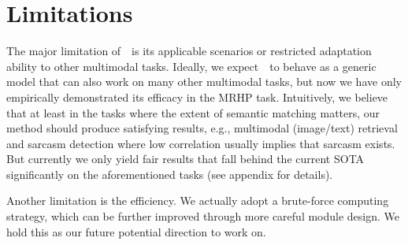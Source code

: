 \section*{Limitations}
The major limitation of~\modelname~is its applicable scenarios or restricted adaptation ability to other multimodal tasks.
Ideally, we expect~\modelname~to behave as a generic model that can also work on many other multimodal tasks, but now we have only empirically demonstrated its efficacy in the MRHP task. 
Intuitively, we believe that at least in the tasks where the extent of semantic matching matters, our method should produce satisfying results, e.g., multimodal (image/text) retrieval and sarcasm detection where low correlation usually implies that sarcasm exists.
But currently we only yield fair results that fall behind the current SOTA significantly on the aforementioned tasks (see appendix for details).

Another limitation is the efficiency. We actually adopt a brute-force computing strategy, which can be further improved through more careful module design. We hold this as our future potential direction to work on.
